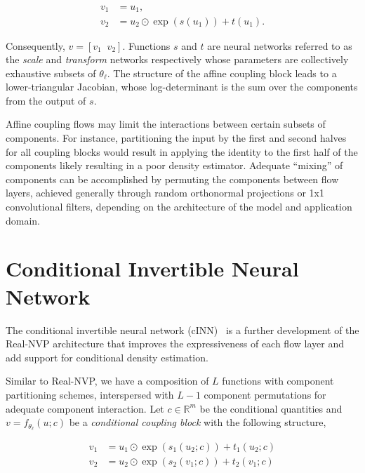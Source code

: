\begin{align}
    v_1 &= u_1, \nonumber \\
    v_2 &= u_2 \odot \exp(s(u_1)) + t(u_1). \nonumber
\end{align}

Consequently, $v = \left[ v_1 \;\; v_2 \right]$.
Functions $s$ and $t$ are neural networks referred to as the \textit{scale} and \textit{transform} networks respectively
whose parameters are collectively exhaustive subsets of $\theta_\ell$.
The structure of the affine coupling block leads to a lower-triangular Jacobian, whose log-determinant is the
sum over the components from the output of $s$.

Affine coupling flows may limit the interactions between certain subsets of components.
For instance, partitioning the input by the first and second halves for all coupling blocks would result in applying
the identity to the first half of the components likely resulting in a poor density estimator.
Adequate ``mixing'' of components can be accomplished by permuting the components between flow layers, achieved
generally through random orthonormal projections or 1x1 convolutional filters, depending on the architecture of the
model and application domain.

\section{Conditional Invertible Neural Network}\label{sec:conditional-invertible-neural-network}

The conditional invertible neural network (cINN)~\cite{cinn} is a further development of the Real-NVP architecture
that improves the expressiveness of each flow layer and add support for conditional density estimation.

Similar to Real-NVP, we have a composition of $L$ functions with component partitioning schemes, interspersed with $L-1$
component permutations for adequate component interaction.
Let $c \in \mathbb{R}^m$ be the conditional quantities and $v = f_{\theta_\ell}(u; c)$ be a
\textit{conditional coupling block} with the following structure,

\begin{align}
    v_1 &= u_1 \odot \exp\left( s_1(u_2; c) \right) + t_1(u_2; c) \\
    v_2 &= u_2 \odot \exp\left( s_2(v_1; c) \right) + t_2(v_1; c)
\end{align}

